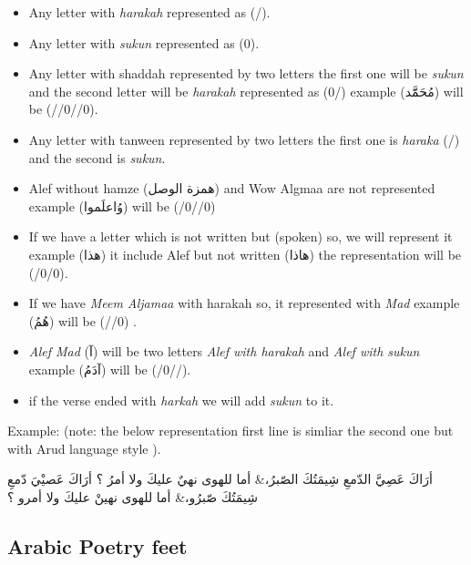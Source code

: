   \begin{itemize}
  \item Any letter with \textit{harakah} represented as (/).
  \item Any letter with \textit{sukun} represented as (0).
  \item Any letter with shaddah represented by two letters the first one will be \textit{sukun} and the second letter will be \textit{harakah} represented as (0/) example (\textarabic{مُحَمََّد}) will be (//0//0).
  \item Any letter with tanween represented by two letters the first one is \textit{haraka} (/) and the second is \textit{sukun}.
  \item Alef without hamze (\textarabic{همزة الوصل}) and Wow Algmaa are not represented example (\textarabic{وُاعلَموا}) will be (/0//0)
  \item If we have a letter which is not written but (spoken) so, we will represent it example (\textarabic{هذا}) it include Alef but not written (\textarabic{هاذا}) the representation will be (/0/0).
  \item If we have \textit{Meem Aljamaa} with harakah so, it represented with \textit{Mad} example (\textarabic{هُمُ}) will be (//0) .
  \item \textit{Alef Mad} (\textarabic{آ}) will be two letters \textit{Alef with harakah} and \textit{Alef with sukun} example (\textarabic{آدَمُ}) will be (/0//).
    \item if the verse ended with \textit{harkah} we will add \textit{sukun} to it.


    \end{itemize}
Example: (note: the below representation first line is simliar the second one but with Arud language style ).
\begin{Arabic}
  \begin{traditionalpoem*}
أرَاكَ عَصِيَّ الدّمعِ شِيمَتُكَ الصّبرُ،\quad & \quad أما للهوى نهيٌ عليكَ ولا أمرُ ؟
أرَاكَ عَصيْيَ دّمعِ شِيمَتُكَ صّبرُو،\quad & \quad أما للهوى نهينْ عليكَ ولا أمرو ؟
	\end{traditionalpoem*}
\end{Arabic}
\newpage

\subsection{Arabic Poetry feet}

